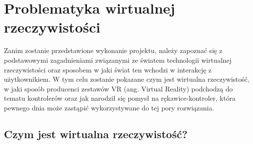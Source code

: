 \chapter{Problematyka wirtualnej rzeczywistości}
\label{ch:zagadnienia}
Zanim zostanie przedstawione wykonanie projektu, należy zapoznać się z podstawowymi zagadnieniami związanymi ze światem technologii wirtualnej rzeczywistości oraz sposobem w jaki świat ten wchodzi w interakcję z użytkownikiem. W tym celu zostanie pokazane czym jest wirtualna rzeczywistość, w jaki sposób producenci zestawów VR (ang. Virtual Reality) podchodzą do tematu kontrolerów oraz jak narodził się pomysł na rękawice-kontroler, która pewnego dnia może zastąpić wykorzystywane do tej pory rozwiązania. 
	\section{Czym jest wirtualna rzeczywistość?}
	\label{sec:vr}
